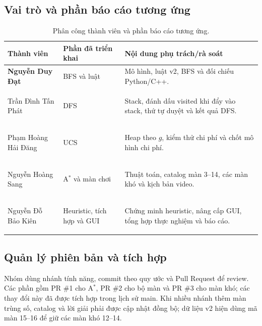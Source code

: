 \documentclass[a4paper]{article}
\newcommand{\astar}{\texorpdfstring{A\ensuremath{^*}}{A*}}
\begin{document}
\subsection{Vai trò và phần báo cáo tương ứng}
\begin{table}[H]
\centering
\small
\renewcommand{\arraystretch}{1.4}
\setlength{\tabcolsep}{7pt}

\begin{tabularx}{\textwidth}{
    |>{\raggedright\arraybackslash\bfseries}p{3cm}
    |>{\raggedright\arraybackslash}p{3cm}
    |>{\raggedright\arraybackslash}X|
}
\hline
\rowcolor{blue!12}
Thành viên &
\textbf{Phần đã triển khai} &
\textbf{Nội dung phụ trách/rà soát} \\
\hline

Nguyễn Duy Đạt &
BFS và luật &
Mô hình, luật v2, BFS và đối chiếu Python/C++. \\
\hline

Trần Đình Tấn Phát &
DFS &
Stack, đánh dấu visited khi đẩy vào stack,
thứ tự duyệt và kết quả DFS. \\
\hline

Phạm Hoàng Hải Đăng &
UCS &
Heap theo $g$, kiểm thử chi phí
và chốt mô hình chi phí. \\
\hline

Nguyễn Hoàng Sang &
\astar{} và màn chơi &
Thuật toán, catalog màn 3--14,
các màn khó và kịch bản video. \\
\hline

Nguyễn Đỗ Bảo Kiên &
Heuristic, tích hợp và GUI &
Chứng minh heuristic, nâng cấp GUI,
tổng hợp thực nghiệm và báo cáo. \\
\hline
\end{tabularx}

\caption[Phân công thành viên]{
Phân công thành viên và phần báo cáo tương ứng.
}
\label{tab:phan-cong-thanh-vien}
\end{table}



\subsection{Quản lý phiên bản và tích hợp}
Nhóm dùng nhánh tính năng, commit theo quy ước và Pull Request để review. Các phần gồm PR \#1 cho \astar{}, PR \#2 cho bộ màn và PR \#3 cho màn khó; các thay đổi này đã được tích hợp trong lịch sử main. Khi nhiều nhánh thêm màn trùng số, catalog và lời giải phải được cập nhật đồng bộ; dữ liệu v2 hiện dùng mã màn 15--16 để giữ các màn khó 12--14.
\end{document}
